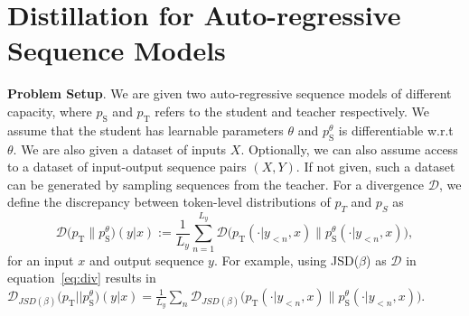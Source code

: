 \documentclass{article} %
\def\eqref#1{equation~\ref{#1}}
\def\D{\mathcal{D}}
\newcommand{\stu}[0]{p_{\text{S}}}
\newcommand{\tea}[0]{p_{\text{T}}}
\begin{document}




\vspace{-0.2cm}
\section{Distillation for Auto-regressive Sequence Models}
\label{sec:methods}
\vspace{-0.2cm}

\textbf{Problem Setup}. We are given two auto-regressive sequence models of different capacity, where $\stu$ and $\tea$ refers to the student and teacher respectively. We assume that the student has learnable parameters $\theta$ and $\stu^\theta$ is differentiable w.r.t  $\theta$. We are also given a dataset of inputs $X$. Optionally, we can also assume access to a dataset of input-output sequence pairs $(X,Y)$. If not given, such a dataset can be generated by sampling sequences from the teacher. %
For a divergence $\D$, we define the discrepancy between token-level distributions of $p_T$ and $p_S$ as
\begin{equation}
  \D\big(\tea \| \stu^\theta\big)(y|x) := \frac{1}{L_y} \sum_{n=1}^{L_y} \D\big(\tea(\cdot|y_{<n},x) \| \stu^\theta(\cdot|y_{<n}, x)\big),\label{eq:div}
\end{equation}
for an input $x$ and output sequence $y$. For example, using  JSD($\beta$) as $\D$ in \eqref{eq:div} results in $\D_{JSD(\beta)}\big(\tea || \stu^\theta\big)(y|x) = \frac{1}{L_y} \sum_n \D_{JSD(\beta)} \big( \tea(\cdot|y_{<n},x)\big \|\stu^\theta(\cdot|y_{<n}, x))$.
\end{document}
